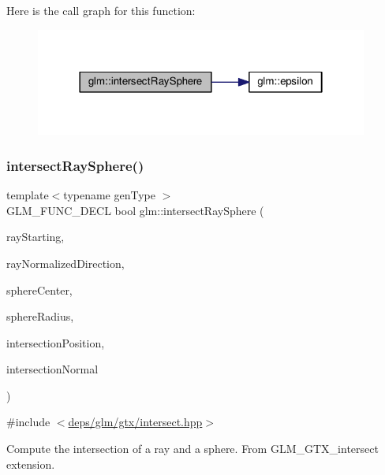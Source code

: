 Here is the call graph for this function\+:
\nopagebreak
\begin{figure}[H]
\begin{center}
\leavevmode
\includegraphics[width=310pt]{df/d2a/group__gtx__intersect_gac88f8cd84c4bcb5b947d56acbbcfa56e_cgraph}
\end{center}
\end{figure}
\mbox{\label{group__gtx__intersect_gad28c00515b823b579c608aafa1100c1d}} 
\subsubsection{\texorpdfstring{intersect\+Ray\+Sphere()}{intersectRaySphere()}\hspace{0.1cm}{\footnotesize\ttfamily [2/2]}}
{\footnotesize\ttfamily template$<$typename gen\+Type $>$ \\
G\+L\+M\+\_\+\+F\+U\+N\+C\+\_\+\+D\+E\+CL bool glm\+::intersect\+Ray\+Sphere (\begin{DoxyParamCaption}\item[{gen\+Type const \&}]{ray\+Starting,  }\item[{gen\+Type const \&}]{ray\+Normalized\+Direction,  }\item[{gen\+Type const \&}]{sphere\+Center,  }\item[{const typename gen\+Type\+::value\+\_\+type}]{sphere\+Radius,  }\item[{gen\+Type \&}]{intersection\+Position,  }\item[{gen\+Type \&}]{intersection\+Normal }\end{DoxyParamCaption})}



{\ttfamily \#include $<$\hyperlink{intersect_8hpp}{deps/glm/gtx/intersect.\+hpp}$>$}

Compute the intersection of a ray and a sphere. From G\+L\+M\+\_\+\+G\+T\+X\+\_\+intersect extension. 

